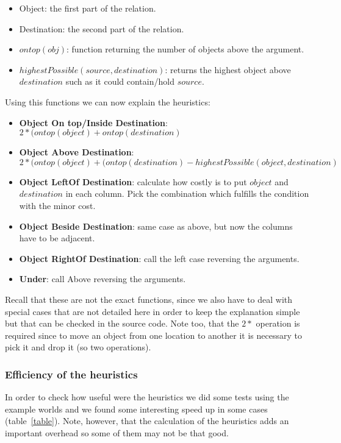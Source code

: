 \documentclass[11pt]{article}
\begin{document}
         \begin{itemize}
          \item Object: the first part of the relation.
          \item Destination: the second part of the relation.
          \item $ontop(obj)$: function returning the number of objects above the argument.
          \item $highestPossible(source, destination)$: returns the highest object 
          above $destination$ such as it could contain/hold $source$.
         \end{itemize}

         Using this functions we can now explain the heuristics:

        \begin{itemize}
          \item {\bf Object On top/Inside Destination}: 
            $2 * (ontop(object) + ontop(destination)$
          \item {\bf Object Above Destination}:
            $2 * (ontop(object) + (ontop(destination) - highestPossible(object, destination)$
          \item {\bf Object LeftOf Destination}: calculate how costly is to put $object$ 
          and $destination$ in each column. Pick the combination which fulfills the 
          condition with the minor cost.
          \item {\bf Object Beside Destination}: same case as above, but now the columns 
          have to be adjacent.
          \item {\bf Object RightOf Destination}: call the left case reversing the 
          arguments.
          \item {\bf Under}: call Above reversing the arguments.
        \end{itemize}

        Recall that these are not the exact functions, since we also have to deal with 
        special cases that are not detailed here in order to keep the explanation simple 
        but that can be checked in the source code. Note too, that the $2 *$ operation is
        required since to move an object from one location to another it is necessary to 
        pick it and drop it (so two operations).

        \subsubsection{Efficiency of the heuristics}
        In order to check how useful were the heuristics we did some tests using the example worlds 
        and we found some interesting speed up in some cases (table~\ref{table}). Note, however, that the 
        calculation of the heuristics adds an important overhead so some of them may not be that good.
\end{document}
